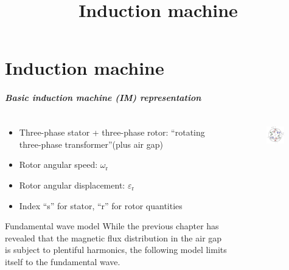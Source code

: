 \part{Induction machine}
\title[Induction machine]{Induction machine}  
\date{}  
\frame{\titlepage} 

\begin{frame}
	\frametitle{Basic induction machine (IM) representation}
    \begin{columns}
		\begin{column}{0.55\textwidth}
	       \begin{itemize}
            \item Three-phase stator + three-phase rotor: ``rotating three-phase transformer''\newline (plus air gap)
            \item Rotor angular speed: $\omega_\mathrm{r}$
            \item Rotor angular displacement: $\varepsilon_\mathrm{r}$
            \item Index ``s'' for stator, ``r'' for rotor quantities
           \end{itemize}
           \begin{varblock}{Fundamental wave model}
              While the previous chapter has revealed that the magnetic flux distribution in the air gap is subject to plentiful harmonics, the following model limits itself to the fundamental wave.
           \end{varblock}
        \end{column}
        \begin{column}{0.45\textwidth}
            \begin{figure}
                \centering
                \includegraphics[width=0.85\textwidth]{fig/lec06/Simple_three_phase_induction_machine_lumped_coils.pdf}

\end{figure}
\end{column}
\end{columns}
\end{frame}

